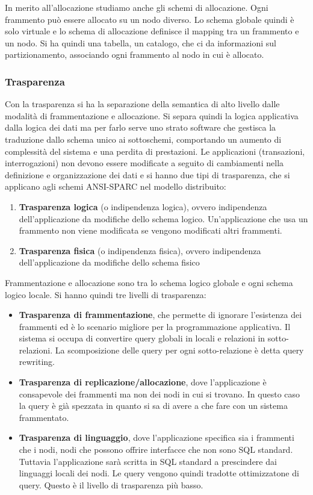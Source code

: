 In merito all'allocazione studiamo anche gli schemi di allocazione. Ogni
frammento può essere allocato su un nodo diverso. Lo schema globale quindi
è solo virtuale e lo schema di allocazione definisce il mapping tra un frammento
e un nodo. Si ha quindi una tabella, un catalogo, che ci da informazioni sul
partizionamento, associando ogni frammento al nodo in cui è allocato.
\subsubsection{Trasparenza}
Con la trasparenza si ha la separazione della semantica di alto livello dalle
modalità di frammentazione e allocazione. Si separa quindi la logica applicativa
dalla logica dei dati ma per farlo serve uno strato software che gestisca la
traduzione dallo schema unico ai sottoschemi, comportando un aumento di
complessità del sistema e una perdita di prestazioni.
Le applicazioni (transazioni, interrogazioni) non devono essere modificate a
seguito di cambiamenti nella definizione e organizzazione dei dati e si hanno
due tipi di trasparenza, che si applicano agli schemi ANSI-SPARC nel
modello distribuito:
\begin{enumerate}
    \item \textbf{Trasparenza logica} (o indipendenza logica), ovvero
          indipendenza dell'applicazione da modifiche dello schema logico.
          Un'applicazione che usa un frammento non viene modificata se vengono
          modificati altri frammenti.
    \item \textbf{Trasparenza fisica} (o indipendenza fisica), ovvero
          indipendenza dell'applicazione da modifiche dello schema fisico
\end{enumerate}

Frammentazione e allocazione sono tra lo schema logico globale e ogni schema
logico locale. Si hanno quindi tre livelli di trasparenza:
\begin{itemize}
    \item \textbf{Trasparenza di frammentazione}, che permette di ignorare
          l'esistenza dei frammenti ed è lo scenario migliore per la
          programmazione applicativa. Il sistema si occupa di convertire query
          globali in locali e relazioni in sotto-relazioni. La scomposizione
          delle query per ogni sotto-relazione è detta query rewriting.
    \item \textbf{Trasparenza di replicazione/allocazione}, dove l'applicazione
          è consapevole dei frammenti ma non dei nodi in cui si trovano. In questo
          caso la query è già spezzata in quanto si sa di avere a che fare con un
          sistema frammentato.
    \item \textbf{Trasparenza di linguaggio}, dove l'applicazione specifica
          sia i frammenti che i nodi, nodi che possono offrire interfacce che
          non sono SQL standard. Tuttavia l'applicazione sarà scritta in SQL
          standard a prescindere dai linguaggi locali dei nodi. Le query
          vengono quindi tradotte ottimizzatone di query. Questo è il livello
          di trasparenza più basso.
\end{itemize}
